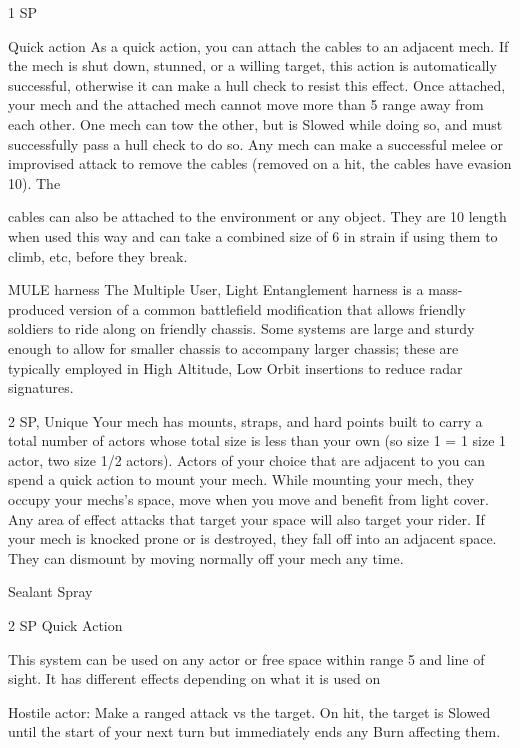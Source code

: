 1 SP  

Quick action  
As a quick action, you can attach the cables to an adjacent mech. If the mech is shut down,  
stunned, or a willing target, this action is automatically successful, otherwise it can make a hull  
check to resist this effect. Once attached, your mech and the attached mech cannot move more  
than 5 range away from each other. One mech can tow the other, but is Slowed while doing so,  
and must successfully pass a hull check to do so. Any mech can make a successful melee or  
improvised attack to remove the cables (removed on a hit, the cables have evasion 10). The  

                                                                                                                      


cables can also be attached to the environment or any object. They are 10 length when used this  
way and can take a combined size of 6 in strain if using them to climb, etc, before they break.
 

MULE harness  
The Multiple User, Light Entanglement harness is a mass-produced version of a common battlefield  
modification that allows friendly soldiers to ride along on friendly chassis. Some systems are large and  
sturdy enough to allow for smaller chassis to accompany larger chassis; these are typically employed in  
High Altitude, Low Orbit insertions to reduce radar signatures.  

2 SP, Unique  
Your mech has mounts, straps, and hard points built to carry a total number of actors whose   
total size is less than your own (so size 1 = 1 size 1 actor, two size 1/2 actors). Actors of your  
choice that are adjacent to you can spend a quick action to mount your mech. While mounting  
your mech, they occupy your mechs’s space, move when you move and benefit from light cover.  
Any area of effect attacks that target your space will also target your rider. If your mech is  
knocked prone or is destroyed, they fall off into an adjacent space. They can dismount by  
moving normally off your mech any time.  

Sealant Spray  

2 SP  
Quick Action  

This system can be used on any actor or free space within range 5 and line of sight. It has  
different effects depending on what it is used on
 
         	Hostile actor: Make a ranged attack vs the target. On hit, the target is Slowed until the  
         start of your next turn but immediately ends any Burn affecting them.
 
